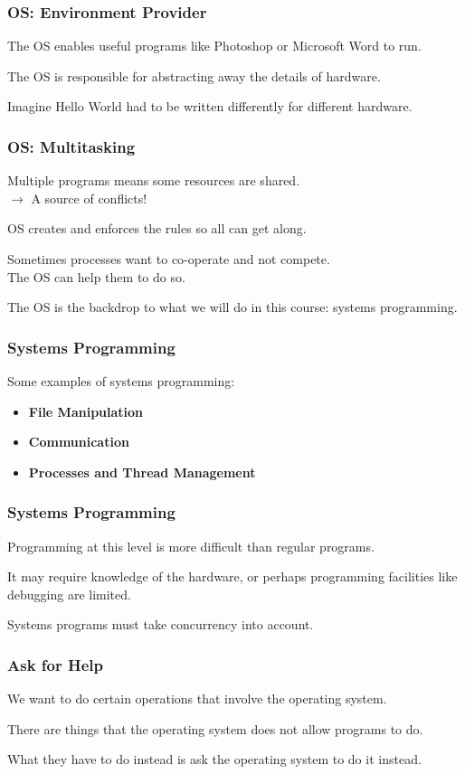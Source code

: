 \begin{frame}
	\frametitle{OS: Environment Provider}

	The OS enables useful programs like Photoshop or Microsoft Word to run.

	The OS is responsible for abstracting away the details of hardware.


	Imagine Hello World had to be written differently for different hardware.


\end{frame}

\begin{frame}
	\frametitle{OS: Multitasking}
	Multiple programs means some resources are shared.\\
	\quad $\rightarrow$ A source of conflicts!

	OS creates and enforces the rules so all can get along.

	Sometimes processes want to co-operate and not compete.\\
	\quad The OS can help them to do so.

	The OS is the backdrop to what we will do in this course: systems programming.

\end{frame}

\begin{frame}
	\frametitle{Systems Programming}

	Some examples of systems programming:

	\begin{itemize}
		\item \textbf{File Manipulation}
		\item \textbf{Communication}
		\item \textbf{Processes and Thread Management}
	\end{itemize}

\end{frame}

\begin{frame}
	\frametitle{Systems Programming}

	Programming at this level is more difficult than regular programs.

	It may require knowledge of the hardware, or perhaps programming facilities like debugging are limited.

	Systems programs must take concurrency into account.

\end{frame}


\begin{frame}
	\frametitle{Ask for Help}

	We want to do certain operations that involve the operating system.

	There are things that the operating system does not allow programs to do.

	What they have to do instead is ask the operating system to do it instead.

\end{frame}

